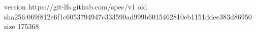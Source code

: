 version https://git-lfs.github.com/spec/v1
oid sha256:069f812e6f1c6053794947c333590ad999b6015462810eb1151ddee383d86950
size 175368
